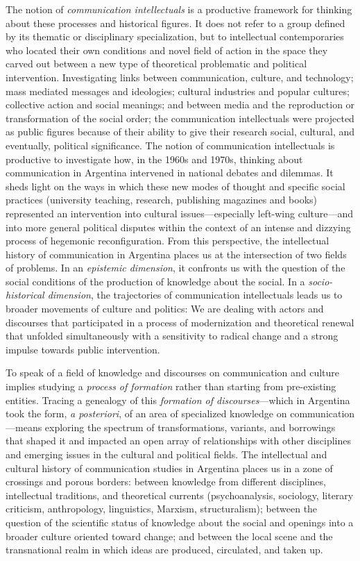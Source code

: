 \documentclass{tufte-handout}
\begin{document}
The notion of \emph{communication intellectuals} is a productive
framework for thinking about these processes and historical
figures\emph{.} It does not refer to a group defined by its thematic or
disciplinary specialization, but to intellectual contemporaries who
located their own conditions and novel field of action in the space they
carved out between a new type of theoretical problematic and political
intervention. Investigating links between communication, culture, and
technology; mass mediated messages and ideologies; cultural industries
and popular cultures; collective action and social meanings; and between
media and the reproduction or transformation of the social order; the
communication intellectuals were projected as public figures because of
their ability to give their research social, cultural, and eventually,
political significance. The notion of communication intellectuals is
productive to investigate how, in the 1960s and 1970s, thinking about
communication in Argentina intervened in national debates and dilemmas.
It sheds light on the ways in which these new modes of thought and
specific social practices (university teaching, research, publishing
magazines and books) represented an intervention into cultural
issues---especially left-wing culture---and into more general political
disputes within the context of an intense and dizzying process of
hegemonic reconfiguration. From this perspective, the intellectual
history of communication in Argentina places us at the intersection of
two fields of problems. In an \emph{epistemic dimension}, it confronts
us with the question of the social conditions of the production of
knowledge about the social. In a \emph{socio-historical dimension}, the
trajectories of communication intellectuals leads us to broader
movements of culture and politics: We are dealing with actors and
discourses that participated in a process of modernization and
theoretical renewal that unfolded simultaneously with a sensitivity to
radical change and a strong impulse towards public intervention.

To speak of a field of knowledge and discourses on communication and
culture implies studying a \emph{process of formation} rather than
starting from pre-existing entities. Tracing a genealogy of this
\emph{formation of discourses}---which in Argentina took the form,
\emph{a posteriori}, of an area of specialized knowledge on
communication---means exploring the spectrum of transformations,
variants, and borrowings that shaped it and impacted an open array of
relationships with other disciplines and emerging issues in the cultural
and political fields. The intellectual and cultural history of
communication studies in Argentina places us in a zone of crossings and
porous borders: between knowledge from different disciplines,
intellectual traditions, and theoretical currents (psychoanalysis,
sociology, literary criticism, anthropology, linguistics, Marxism,
structuralism); between the question of the scientific status of
knowledge about the social and openings into a broader culture oriented
toward change; and between the local scene and the transnational realm
in which ideas are produced, circulated, and taken up.
\end{document}
